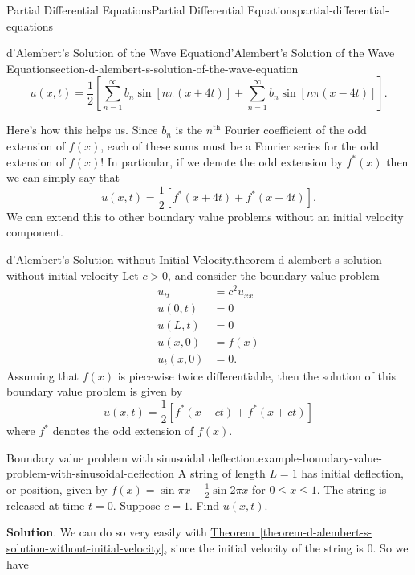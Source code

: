 \documentclass[oneside,10pt,]{book}
\numberwithin{equation}{section}
\renewcommand{\th}{\text{th}}
\newcommand{\gt}{>}
\newcommand{\amp}{&}
\begin{document}
\begin{chapterptx}{Partial Differential Equations}{}{Partial Differential Equations}{}{}{partial-differential-equations}
\begin{sectionptx}{d'Alembert's Solution of the Wave Equation}{}{d'Alembert's Solution of the Wave Equation}{}{}{section-d-alembert-s-solution-of-the-wave-equation}
\begin{equation*}
u(x,t) = \frac{1}{2}\left[\sum_{n=1}^{\infty}b_{n}\sin[n\pi(x+4t)] + \sum_{n=1}^{\infty}b_{n}\sin[n\pi(x-4t)]\right].
\end{equation*}
%
\par
\hypertarget{p-672}{}%
Here's how this helps us. Since \(b_{n}\) is the \(n^{\th}\) Fourier coefficient of the odd extension of \(f(x)\), each of these sums must be a Fourier series for the odd extension of \(f(x)\)! In particular, if we denote the odd extension by \(f^{*}(x)\) then we can simply say that%
%
\begin{equation*}
u(x,t) = \frac{1}{2}[f^{*}(x+4t)+f^{*}(x-4t)].
\end{equation*}
\hypertarget{p-673}{}%
We can extend this to other boundary value problems without an initial velocity component.%
\begin{theorem}{d'Alembert's Solution without Initial Velocity.}{}{theorem-d-alembert-s-solution-without-initial-velocity}%
\hypertarget{p-674}{}%
Let \(c\gt0\), and consider the boundary value problem%
%
\begin{align*}
u_{tt} \amp = c^{2}u_{xx} \\
u(0,t) \amp = 0 \\
u(L,t) \amp = 0 \\
u(x,0) \amp = f(x) \\
u_{t}(x,0) \amp = 0 \text{.}
\end{align*}
\hypertarget{p-675}{}%
Assuming that \(f(x)\) is piecewise twice differentiable, then the solution of this boundary value problem is given by%
\begin{equation*}
u(x,t) = \frac{1}{2}[f^{*}(x-ct)+f^{*}(x+ct)]
\end{equation*}
where \(f^{*}\) denotes the odd extension of \(f(x)\).%
\end{theorem}
\begin{example}{Boundary value problem with sinusoidal deflection.}{example-boundary-value-problem-with-sinusoidal-deflection}%
\hypertarget{p-676}{}%
A string of length \(L=1\) has initial deflection, or position, given by \(f(x) = \sin\pi x - \frac{1}{2}\sin2\pi x\) for \(0\leq x\leq 1\). The string is released at time \(t=0\). Suppose \(c=1\). Find \(u(x,t)\).%
\par\smallskip%
\noindent\textbf{Solution}.\hypertarget{solution-95}{}\quad%
\hypertarget{p-677}{}%
We can do so very easily with \hyperref[theorem-d-alembert-s-solution-without-initial-velocity]{Theorem~\ref{theorem-d-alembert-s-solution-without-initial-velocity}}, since the initial velocity of the string is \(0\). So we have%

\end{example}
\end{sectionptx}
\end{chapterptx}
\end{document}
